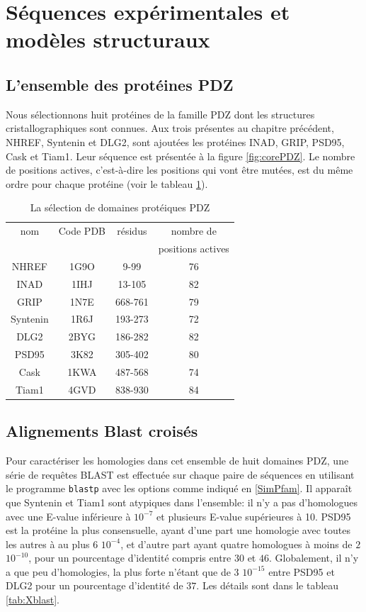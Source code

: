 \section{Séquences expérimentales et modèles structuraux}
\subsection{L'ensemble des protéines PDZ}
Nous sélectionnons huit protéines de la famille PDZ dont les structures cristallographiques sont connues. Aux trois présentes au chapitre précédent, NHREF, Syntenin et DLG2, sont ajoutées les protéines INAD, GRIP, PSD95, Cask et Tiam1. Leur séquence est présentée à la figure \ref{fig:corePDZ}. Le nombre de positions actives, c'est-à-dire les positions qui vont être mutées, est du même ordre pour chaque protéine (voir le tableau \ref{tab:protéines_PDZ}).

\begin{table}[!htbp]
  \centering
  \caption{La sélection de domaines protéiques PDZ}
  \begin{tabular}{cccc}
    \toprule
    nom & Code PDB & résidus &  nombre de \\
        &          &         & positions actives \\
    \cmidrule{1-4}
    NHREF    & 1G9O  & 9-99    & 76 \\
    INAD     & 1IHJ  & 13-105  & 82 \\
    GRIP     & 1N7E  & 668-761 & 79 \\
    Syntenin & 1R6J  & 193-273 & 72 \\
    DLG2     & 2BYG  & 186-282 & 82 \\
    PSD95    & 3K82  & 305-402 & 80 \\
    Cask     & 1KWA  & 487-568 & 74 \\
    Tiam1    & 4GVD  & 838-930 & 84 \\
    \bottomrule
    
  \end{tabular}      
  \label{tab:protéines_PDZ}      
\end{table}

\subsection{Alignements Blast croisés}
   
Pour caractériser les homologies dans cet ensemble de huit domaines PDZ, une série de requêtes BLAST est effectuée sur chaque paire de séquences en utilisant le programme \verb!blastp! avec les options comme indiqué en \ref{SimPfam}. Il apparaît que Syntenin et Tiam1 sont atypiques dans l'ensemble: il n'y a pas d'homologues avec une E-value inférieure à $10^{-7}$ et plusieurs E-value supérieures à 10. PSD95 est la protéine la plus consensuelle, ayant d'une part une homologie avec toutes les autres à au plus $6$ $10^{-4}$, et d'autre part ayant quatre homologues à moins de $2$ $10^{-10}$, pour un pourcentage d'identité compris entre $30$ et $46$. Globalement, il n'y a que peu d'homologies, la plus forte n'étant que de $3$ $10^{-15}$ entre PSD95 et DLG2 pour un pourcentage d'identité de $37$. Les détails sont dans le tableau \ref{tab:Xblast}.

